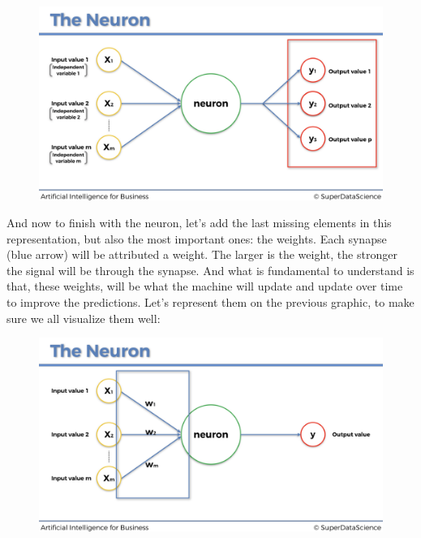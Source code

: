 \documentclass[]{book}
\begin{document}
\begin{figure}[!htbp]
        \begin{center}
            \includegraphics[scale=0.15]{ANN_7.png}
        \end{center}
\end{figure}

And now to finish with the neuron, let's add the last missing elements in this representation, but also the most important ones: the weights. Each synapse (blue arrow) will be attributed a weight. The larger is the weight, the stronger the signal will be through the synapse. And what is fundamental to understand is that, these weights, will be what the machine will update and update over time to improve the predictions. Let's represent them on the previous graphic, to make sure we all visualize them well:

\begin{figure}[!htbp]
        \begin{center}
            \includegraphics[scale=0.15]{ANN_8.png}
        \end{center}
\end{figure}
\end{document}
